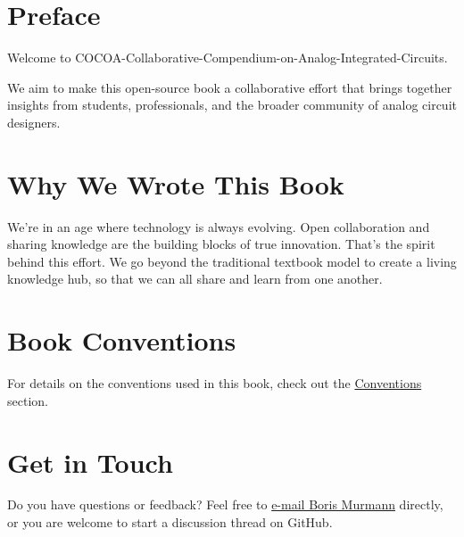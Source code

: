 \documentclass[
  11pt,
  letterpaper,
  abstract]{scrbook}
\author{}
\date{}
\renewcommand*\contentsname{Table of contents}
\newcommand\contentsname{Table of contents}
\begin{document}
\frontmatter

\renewcommand*\contentsname{Table of contents}
{
\setcounter{tocdepth}{2}
\tableofcontents
}

\mainmatter
\chapter*{Preface}\label{preface}

Welcome to COCOA-Collaborative-Compendium-on-Analog-Integrated-Circuits.

We aim to make this open-source book a collaborative effort that brings
together insights from students, professionals, and the broader
community of analog circuit designers.

\chapter{Why We Wrote This Book}\label{why-we-wrote-this-book}

We're in an age where technology is always evolving. Open collaboration
and sharing knowledge are the building blocks of true innovation. That's
the spirit behind this effort. We go beyond the traditional textbook
model to create a living knowledge hub, so that we can all share and
learn from one another.

\chapter{Book Conventions}\label{book-conventions}

For details on the conventions used in this book, check out the
\href{./contents/conventions.qmd}{Conventions} section.

\chapter{Get in Touch}\label{get-in-touch}

Do you have questions or feedback? Feel free to
\href{mailto:bmurmann@hawaii.edu?subject=“COCOA”}{e-mail Boris Murmann}
directly, or you are welcome to start a discussion thread on GitHub.


\backmatter
\end{document}
